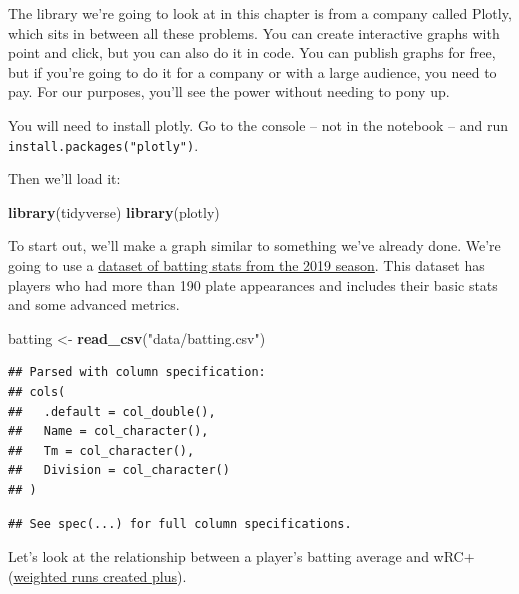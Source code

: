 \documentclass[
]{book}
\newenvironment{Shaded}{\begin{snugshade}}{\end{snugshade}}
\newcommand{\KeywordTok}[1]{\textcolor[rgb]{0.13,0.29,0.53}{\textbf{#1}}}
\newcommand{\NormalTok}[1]{#1}
\newcommand{\StringTok}[1]{\textcolor[rgb]{0.31,0.60,0.02}{#1}}
\begin{document}
The library we're going to look at in this chapter is from a company called Plotly, which sits in between all these problems. You can create interactive graphs with point and click, but you can also do it in code. You can publish graphs for free, but if you're going to do it for a company or with a large audience, you need to pay. For our purposes, you'll see the power without needing to pony up.

You will need to install plotly. Go to the console -- not in the notebook -- and run \texttt{install.packages("plotly")}.

Then we'll load it:

\begin{Shaded}
\begin{Highlighting}[]
\KeywordTok{library}\NormalTok{(tidyverse)}
\KeywordTok{library}\NormalTok{(plotly)}
\end{Highlighting}
\end{Shaded}

To start out, we'll make a graph similar to something we've already done. We're going to use a \href{https://unl.box.com/s/xg0eqvmz9ynnegvjabv21ev5qlsd7mjs}{dataset of batting stats from the 2019 season}. This dataset has players who had more than 190 plate appearances and includes their basic stats and some advanced metrics.

\begin{Shaded}
\begin{Highlighting}[]
\NormalTok{batting <-}\StringTok{ }\KeywordTok{read_csv}\NormalTok{(}\StringTok{"data/batting.csv"}\NormalTok{)}
\end{Highlighting}
\end{Shaded}

\begin{verbatim}
## Parsed with column specification:
## cols(
##   .default = col_double(),
##   Name = col_character(),
##   Tm = col_character(),
##   Division = col_character()
## )
\end{verbatim}

\begin{verbatim}
## See spec(...) for full column specifications.
\end{verbatim}

Let's look at the relationship between a player's batting average and wRC+ (\href{http://m.mlb.com/glossary/advanced-stats/weighted-runs-created-plus}{weighted runs created plus}).
\end{document}
